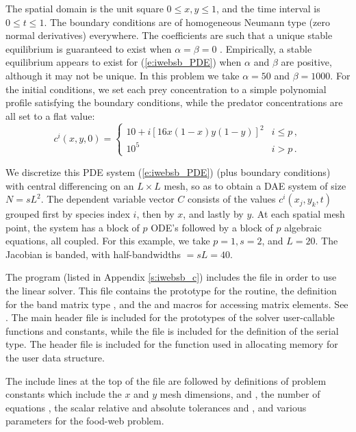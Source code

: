 The spatial domain is the unit square $0 \leq x,y \leq 1$, and the
time interval is $0 \leq t \leq 1$.  The boundary conditions are of
homogeneous Neumann type (zero normal derivatives) everywhere.  
The coefficients
are such that a unique stable equilibrium is guaranteed to exist when
$\alpha = \beta = 0$ \cite{Bro:86}.  Empirically, a stable equilibrium
appears to exist for (\ref{e:iwebsb_PDE}) when $\alpha$ and $\beta$ are
positive, although it may not be unique. In this problem we take
$\alpha = 50$ and $\beta = 1000$.  For the initial conditions, we set
each prey concentration to a simple polynomial profile satisfying the
boundary conditions, while the predator concentrations are all set to
a flat value:
\begin{equation*}
c^i(x,y,0) = 
\begin{cases}
  10 + i [16x(1 - x)y(1 - y)]^2 & i \leq p \, , \\
  10^5                          & i > p \, .
\end{cases}
\end{equation*}

We discretize this PDE system (\ref{e:iwebsb_PDE}) (plus boundary conditions)
with central differencing on an $L \times L$ mesh, so as to obtain a
DAE system of size $N = s L^2$.  The dependent variable vector $C$
consists of the values $c^i(x_j,y_k,t)$ grouped first by species index
$i$, then by $x$, and lastly by $y$.  At each spatial mesh point, the
system has a block of $p$ ODE's followed by a block of $p$ algebraic
equations, all coupled.
For this example, we take $p = 1, s = 2$, and $L = 20$.
The Jacobian is banded, with half-bandwidths  $= sL = 40$.

The  program (listed in Appendix \ref{s:iwebsb_c})
includes the file  in order to use the {\idaband} linear solver. 
This file contains the prototype for the  routine,
the definition for the band matrix type , and the
 and  macros for accessing matrix
elements. See .
The main {\ida} header file  is included for the prototypes of the
solver user-callable functions and {\ida} constants, while the file
 is included for the definition of the serial
 type.  The header file  is included for the
 function used in allocating memory for the user data structure.

The include lines at the top of the file are followed by definitions of
problem constants which include the $x$ and $y$ mesh dimensions,  and
, the number of equations , the scalar relative and absolute
tolerances  and , and various parameters for the food-web problem.

